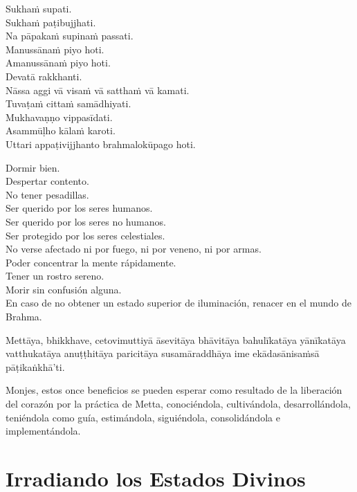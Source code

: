 Sukhaṁ supati.\\
Sukhaṁ paṭibujjhati.\\
Na pāpakaṁ supinaṁ passati.\\
Manussānaṁ piyo hoti.\\
Amanussānaṁ piyo hoti.\\
Devatā rakkhanti.\\
Nāssa aggi vā visaṁ vā satthaṁ vā kamati.\\
Tuvaṭaṁ cittaṁ samādhiyati.\\
Mukhavaṇṇo vippasīdati.\\
Asammūḷho kālaṁ karoti.\\
Uttari appaṭivijjhanto brahmalokūpago hoti.

\clearpage

\begin{english}
  Dormir bien.\\
  Despertar contento.\\
  No tener pesadillas.\\
  Ser querido por los seres humanos.\\
  Ser querido por los seres no humanos.\\
  Ser protegido por los seres celestiales.\\
  No verse afectado ni por fuego, ni por veneno, ni por armas.\\
  Poder concentrar la mente rápidamente.\\
  Tener un rostro sereno.\\
  Morir sin confusión alguna.\\
  En caso de no obtener un estado superior de iluminación, renacer en el mundo de Brahma.
\end{english}

Mettāya, bhikkhave, cetovimuttiyā āsevitāya bhāvitāya bahulīkatāya yānīkatāya vatthukatāya anuṭṭhitāya paricitāya susamāraddhāya ime ekādasānisaṁsā pāṭikaṅkhā'ti.

\begin{english}
  Monjes, estos once beneficios se pueden esperar como resultado de la liberación del corazón por la práctica de Metta, conociéndola, cultivándola, desarrollándola, teniéndola como guía, estimándola, siguiéndola, consolidándola e implementándola.
\end{english}

\chapter*[Irradiando los Estados Divinos]{Irradiando los Estados Divinos}

